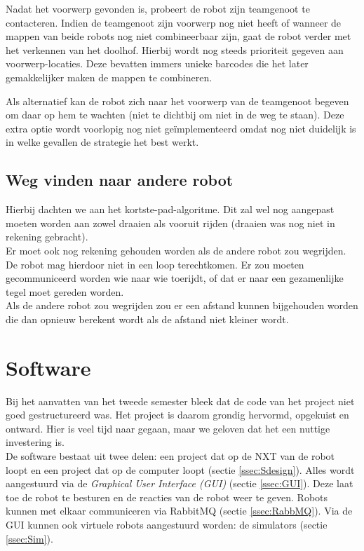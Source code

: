 \documentclass[tt2]{penoverslag}
\begin{document}
Nadat het voorwerp gevonden is, probeert de robot zijn teamgenoot te contacteren. Indien de teamgenoot zijn voorwerp nog niet heeft of wanneer de mappen van beide robots nog niet combineerbaar zijn, gaat de robot verder met het verkennen van het doolhof. Hierbij wordt nog steeds prioriteit gegeven aan voorwerp-locaties. Deze bevatten immers unieke barcodes die het later gemakkelijker maken de mappen te combineren.

Als alternatief kan de robot zich naar het voorwerp van de teamgenoot begeven om daar op hem te wachten (niet te dichtbij om niet in de weg te staan). Deze extra optie wordt voorlopig nog niet ge\"implementeerd omdat nog niet duidelijk is in welke gevallen de strategie het best werkt.


\subsection{Weg vinden naar andere robot}
Hierbij dachten we aan het kortste-pad-algoritme. Dit zal wel nog aangepast moeten worden aan zowel draaien als vooruit rijden (draaien was nog niet in rekening gebracht).\\ Er moet ook nog rekening gehouden worden als de andere robot zou wegrijden. De robot mag hierdoor niet in een loop terechtkomen. Er zou moeten gecommuniceerd worden wie naar wie toerijdt, of dat er naar een gezamenlijke tegel moet gereden worden. \\
Als de andere robot zou wegrijden zou er een afstand kunnen bijgehouden worden die dan opnieuw berekent wordt als de afstand niet kleiner wordt.

\section{Software}
\label{secc:softw}

Bij het aanvatten van het tweede semester bleek dat de code van het project niet goed gestructureerd was. Het project is daarom grondig hervormd, opgekuist en ontward. Hier is veel tijd naar gegaan, maar we geloven dat het een nuttige investering is.\\

De software bestaat uit twee delen: een project dat op de NXT van de robot loopt en een project dat op de computer loopt (sectie \ref{ssec:Sdesign}). Alles wordt aangestuurd via de \textit{Graphical User Interface (GUI)} (sectie \ref{ssec:GUI}). Deze laat toe de robot te besturen en de reacties van de robot weer te geven. Robots kunnen met elkaar communiceren via RabbitMQ (sectie \ref{ssec:RabbMQ}). Via de GUI kunnen ook virtuele robots aangestuurd worden: de simulators (sectie \ref{ssec:Sim}).\\
\end{document}
